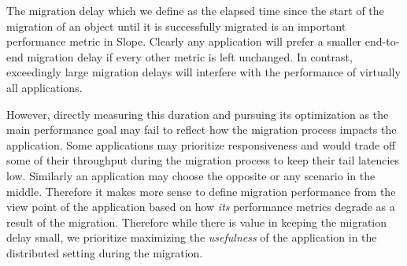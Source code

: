 The migration delay which we define as the elapsed time since the start of the
migration of an object until it is successfully migrated is an important
performance metric in Slope. Clearly any application will prefer a smaller
end-to-end migration delay if every other metric is left unchanged. In contrast,
exceedingly large migration delays will interfere with the performance of
virtually all applications.

However, directly measuring this duration and pursuing its optimization
as the main performance goal may fail
\CHECK{} to reflect how the migration process impacts the application. Some
applications may prioritize responsiveness and would trade off some of their
throughput during the migration process to keep their tail latencies low.
Similarly an application may choose the opposite or any scenario in the middle.
Therefore it makes more sense to define migration performance from the view
point of the application based on how \emph{its} performance metrics degrade
as a result of the migration. Therefore while there is value in keeping the
migration delay small, we prioritize maximizing the \emph{usefulness} of the
application in the distributed setting during the migration.


